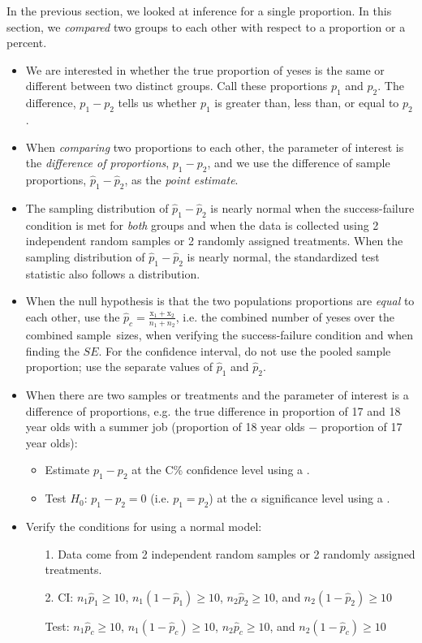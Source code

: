 \noindent In the previous section, we looked at inference for a single proportion.  In this section, we \emph{compared} two groups to each other with respect to a proportion or a percent.
\begin{itemize} 
\item We are interested in whether the true proportion of yeses is the same or different between two distinct groups.  Call these proportions $p_1$ and $p_2$.  The difference, $p_1-p_2$ tells us whether $p_1$ is greater than, less than, or equal to $p_2$.  

\item When \emph{comparing} two proportions to each other, the parameter of interest is the \emph{difference of proportions}, $p_1-p_2$, and we use the difference of sample proportions, $\hat{p}_1-\hat{p}_2$, as the \emph{point estimate}.  

\item The sampling distribution of $\hat{p}_1-\hat{p}_2$ is nearly normal when the success-failure condition is met for \textit{both} groups and when the data is collected using 2 independent random samples or 2 randomly assigned treatments.  When the sampling distribution of $\hat{p}_1-\hat{p}_2$ is nearly normal, the standardized test statistic also follows a  distribution.

\item When the null hypothesis is that the two populations proportions are \textit{equal} to each other, use the  $\hat{p}_c=\frac{\text{x}_1+\text{x}_2}{n_1+n_2}$, i.e. the combined number of yeses over the combined sample~sizes, when verifying the success-failure condition and when finding the $SE$.  For the confidence interval, do not use the pooled sample proportion; use the separate values of  $\hat{p}_1$ and $\hat{p}_2$.  
\item When there are two samples or treatments and the parameter of interest is a difference of proportions, e.g. the true difference in proportion of 17 and 18 year olds with a summer job (proportion of 18 year olds $-$ proportion of 17 year olds): 
\begin{itemize}
\setlength{\itemsep}{0mm}
\item Estimate $p_1-p_2$ at the C\% confidence level using a .
\item Test $H_0$: $p_1-p_2=0$ (i.e. $p_1=p_2$) at the $\alpha$ significance level using a .
\end{itemize}
\item Verify the conditions for using a normal model:  \vspace{-1mm}
\begin{itemize}
\item[1.] Data come from 2 independent random samples or 2 randomly assigned treatments.
\item[2.] CI:  $n_1\hat{p}_1\ge 10$, $n_1(1-\hat{p}_1)\ge 10$, $n_2\hat{p}_2\ge 10$, and $n_2(1-\hat{p}_2)\ge 10$ 
\item[] Test: $n_1\hat{p}_c\ge 10$, $n_1(1-\hat{p}_c)\ge 10$, $n_2\hat{p}_c\ge 10$, and $n_2(1-\hat{p}_c)\ge 10$
\end{itemize}


\end{itemize}
